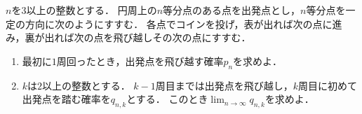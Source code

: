 \documentclass[../../main.tex]{subfiles}
\begin{document}
$n$を$3$以上の整数とする．
円周上の$n$等分点のある点を出発点とし，$n$等分点を一定の方向に次のようにすすむ．
各点でコインを投げ，表が出れば次の点に進み，裏が出れば次の点を飛び越しその次の点にすすむ．

\begin{enumerate}
  \item 最初に$1$周回ったとき，出発点を飛び越す確率$p_n$を求めよ．
  \item $k$は$2$以上の整数とする．
    $k-1$周目までは出発点を飛び越し，$k$周目に初めて出発点を踏む確率を$q_{n,k}$とする．
    このとき$\lim_{n\to\infty}q_{n,k}$を求めよ．
\end{enumerate}
\end{document}
